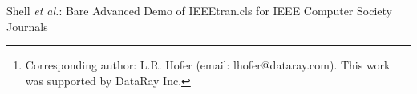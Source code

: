 \documentclass[10pt,journal,compsoc]{IEEEtran}
\begin{document}
 \author{\\
\thanks{Corresponding author: L.R. Hofer (email: lhofer@dataray.com).
This work was supported by DataRay Inc.}}


% 
%



\markboth{}%
{Shell \MakeLowercase{\textit{et al.}}: Bare Advanced Demo of IEEEtran.cls for IEEE Computer Society Journals}
% 
\end{document}
